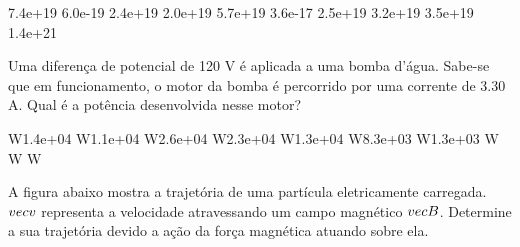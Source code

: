 \documentclass[12pt, addpoints]{exam}
\begin{document}
\begin{questions}
\begin{multicols*}{2}
\begin{oneparchoices}
\choice 7.4e+19 \choice 6.0e-19 \choice 2.4e+19 \choice 2.0e+19 \choice 5.7e+19 \choice 3.6e-17 \choice 2.5e+19 \choice 3.2e+19 \choice 3.5e+19 \choice 1.4e+21 
\end{oneparchoices}\question Uma diferença de potencial de 120 V é aplicada a uma bomba d’água. Sabe-se que em funcionamento, o motor da bomba é percorrido por uma corrente de    3.30 A. Qual é a potência desenvolvida nesse motor?

\begin{oneparchoices}
 W\choice 1.4e+04 W\choice 1.1e+04 W\choice 2.6e+04 W\choice 2.3e+04 W\choice 1.3e+04 W\choice 8.3e+03 W\choice 1.3e+03 W W W
\end{oneparchoices}\question A ﬁgura abaixo mostra a trajetória de uma partícula eletricamente carregada. $\\vec{{v}}$ representa a velocidade atravessando um campo magnético $\\vec{{B}}$. Determine a sua trajetória devido a ação da força magnética atuando sobre ela.
        
        \begin{center}
            \begin{minipage}[c]{0.5\linewidth}
            \end{minipage}
        \end{center}


\end{multicols*}
\end{questions}
\end{document}
